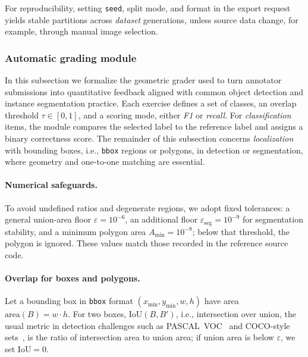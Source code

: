 \documentclass[runningheads]{llncs}
\begin{document}
For reproducibility, setting \texttt{seed}, split mode, and format in the export request yields stable partitions across \textit{dataset} generations, unless source data change, for example, through manual image selection.

\subsubsection{Automatic grading module}

In this subsection we formalize the geometric grader used to turn annotator submissions into quantitative feedback aligned with common object detection and instance segmentation practice. Each exercise defines a set of classes, an overlap threshold $\tau \in [0,1]$, and a scoring mode, either \emph{F1} or \emph{recall}. For \emph{classification} items, the module compares the selected label to the reference label and assigns a binary correctness score. The remainder of this subsection concerns \emph{localization} with bounding boxes, i.e., \texttt{bbox} regions or polygons, in detection or segmentation, where geometry and one-to-one matching are essential.

\paragraph{Numerical safeguards.}
To avoid undefined ratios and degenerate regions, we adopt fixed tolerances: a general union-area floor $\varepsilon = 10^{-6}$, an additional floor $\varepsilon_{\mathrm{seg}} = 10^{-9}$ for segmentation stability, and a minimum polygon area $A_{\min}=10^{-8}$; below that threshold, the polygon is ignored. These values match those recorded in the reference source code.

\paragraph{Overlap for boxes and polygons.}
Let a bounding box in \texttt{bbox} format $(x_{\min}, y_{\min}, w, h)$ have area $\mathrm{area}(B)=w\cdot h$. For two boxes, $\mathrm{IoU}(B,B')$, i.e., intersection over union, the usual metric in detection challenges such as PASCAL~VOC~\cite{everingham2010pascal} and COCO-style sets~\cite{lin2014microsoft}, is the ratio of intersection area to union area; if union area is below $\varepsilon$, we set $\mathrm{IoU}=0$.
\end{document}
